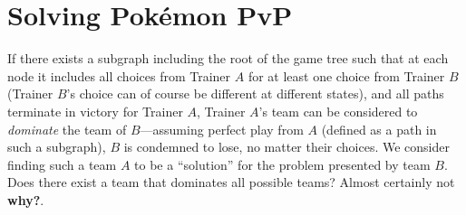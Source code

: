 \section{Solving Pokémon PvP}
If there exists a subgraph including the root of the game tree such that at each
  node it includes all choices from Trainer $A$ for at least one choice from Trainer $B$
  (Trainer $B$'s choice can of course be different at different states), and all
  paths terminate in victory for Trainer $A$, Trainer $A$'s team can be considered
  to \textit{dominate} the team of $B$---assuming perfect play from $A$ (defined
  as a path in such a subgraph), $B$ is condemned to lose, no matter their choices.
We consider finding such a team $A$ to be a ``solution'' for the problem presented
  by team $B$.
Does there exist a team that dominates all possible teams?
Almost certainly not \textbf{why?}.
